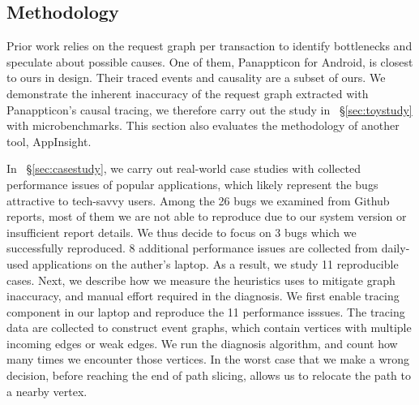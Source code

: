 \subsection{Methodology} \label{sec:methodology}


Prior work relies on the request graph per transaction to identify bottlenecks
and speculate about possible causes. One of them, Panappticon for Android, is
closest to ours in design. Their traced events and causality are a subset
of ours. We demonstrate the inherent inaccuracy of the request graph extracted
with Panappticon's causal tracing, we therefore carry out the study in
~\S\ref{sec:toystudy} with microbenchmarks. This section also evaluates the methodology of
another tool, AppInsight.

In ~\S\ref{sec:casestudy}, we carry out real-world case studies with collected
performance issues of popular applications, which likely represent the
bugs attractive to tech-savvy users. Among the 26 bugs we examined from
Github reports, most of them we are not able to reproduce due to our system version
or insufficient report details. We thus decide to focus on 3 bugs which we
successfully reproduced. 8 additional performance issues are collected from
daily-used applications on the auther's laptop. As a result, we study 11
reproducible cases.
Next, we describe how we measure the heuristics \xxx uses to mitigate graph
inaccuracy, and manual effort required in the diagnosis. We first enable tracing
component in our laptop and reproduce the 11 performance isssues. The tracing
data are collected to construct event graphs, which contain vertices with
multiple incoming edges or weak edges. We run the \xxx diagnosis algorithm, and
count how many times we encounter those vertices. In the worst case that we make
a wrong decision, before reaching the end of path slicing, \xxx allows us to
relocate the path to a nearby vertex.
